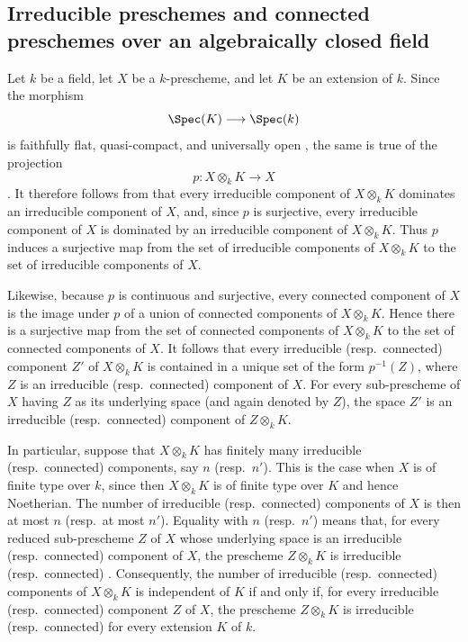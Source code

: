 \subsection{Irreducible preschemes and connected preschemes over an algebraically closed field}
\label{subsection:IV.4.4}

\begin{env}[4.4.1]
\label{IV.4.4.1}
Let $k$ be a field, let $X$ be a $k$-prescheme, and let $K$ be an
extension of $k$.
Since the morphism
\[
\Spec(K)\longrightarrow\Spec(k)
\]
is faithfully flat, quasi-compact, and universally open
, the same is true of the projection
\[
p:X\otimes_k K\longrightarrow X
\]
.
It therefore follows from  that every irreducible
component of $X\otimes_k K$ dominates an irreducible component of $X$,
and, since $p$ is surjective, every irreducible component of $X$ is
dominated by an irreducible component of $X\otimes_k K$.
Thus $p$ induces a surjective map from the set of irreducible components
of $X\otimes_k K$ to the set of irreducible components of $X$.

Likewise, because $p$ is continuous and surjective, every connected
component of $X$ is the image under $p$ of a union of connected
components of $X\otimes_k K$.
Hence there is a surjective map from the set of connected components of
$X\otimes_k K$ to the set of connected components of $X$.
It follows that every irreducible (resp.\ connected) component $Z'$ of
$X\otimes_k K$ is contained in a unique set of the form $p^{-1}(Z)$,
where $Z$ is an irreducible (resp.\ connected) component of $X$.
For every sub-prescheme of $X$ having $Z$ as its underlying space (and
again denoted by $Z$), the space $Z'$ is an irreducible
(resp.\ connected) component of $Z\otimes_k K$.

In particular, suppose that $X\otimes_k K$ has finitely many
irreducible (resp.\ connected) components, say $n$ (resp.\ $n'$).
This is the case when $X$ is of finite type over $k$, since then
$X\otimes_k K$ is of finite type over $K$ and hence Noetherian.
The number of irreducible (resp.\ connected) components of $X$ is then
at most $n$ (resp.\ at most $n'$).
Equality with $n$ (resp.\ $n'$) means that, for every reduced
sub-prescheme $Z$ of $X$ whose underlying space is an irreducible
(resp.\ connected) component of $X$, the prescheme $Z\otimes_k K$ is
irreducible (resp.\ connected) .
Consequently, the number of irreducible (resp.\ connected) components of
$X\otimes_k K$ is independent of $K$ if and only if, for every
irreducible (resp.\ connected) component $Z$ of $X$, the prescheme
$Z\otimes_k K$ is irreducible (resp.\ connected) for every extension
$K$ of $k$.


\end{env}
